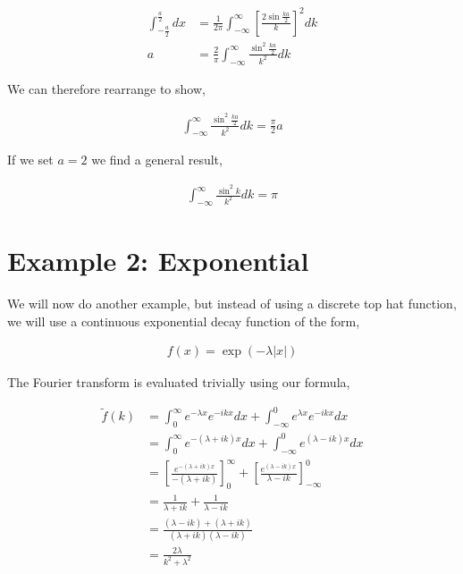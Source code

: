 \documentclass[11pt]{amsart}
\begin{document}
\begin{align*}
  \int_{-\frac{a}{2}}^{\frac{a}{2}}dx &= \frac{1}{2\pi}\int_{-\infty}^{\infty}{\left[\frac{2\sin{\frac{ka}{2}}}{k}\right]}^2 dk \\
  a &= \frac{2}{\pi}\int_{-\infty}^{\infty}\frac{\sin^2{\frac{ka}{2}}}{k^2} dk
\end{align*}

We can therefore rearrange to show,

\begin{align*}
  \int_{-\infty}^{\infty}\frac{\sin^2{\frac{ka}{2}}}{k^2}dk = \frac{\pi}{2}a
\end{align*}

If we set $a = 2$ we find a general result,

\begin{align*}
  \int_{-\infty}^{\infty}\frac{\sin^2{k}}{k^2}dk = \pi
\end{align*}


\section{Example 2: Exponential}

We will now do another example, but instead of using a discrete top hat function, we will use a continuous exponential decay function of the form,

\begin{align*}
  f(x) = \exp{\left(-\lambda |x|\right)}
\end{align*}

The Fourier transform is evaluated trivially using our formula,

\begin{align*}
  \tilde{f}(k) &= \int_{0}^{\infty}e^{-\lambda x}e^{-ikx}dx + \int_{-\infty}^{0}e^{\lambda x}e^{-ikx} dx \\
               &= \int_0^{\infty}e^{-(\lambda + ik)x}dx + \int_{-\infty}^0 e^{(\lambda -ik)x}dx \\
               &= {\left[\frac{e^{-(\lambda + ik)x}}{-(\lambda + ik)}\right]}_0^{\infty} + \left[\frac{e^{(\lambda - ik) x}}{\lambda - ik}\right]_{-\infty}^0 \\
               &= \frac{1}{\lambda + ik} + \frac{1}{\lambda - ik} \\
               &= \frac{(\lambda - ik) + (\lambda + ik)}{(\lambda + ik)(\lambda - ik)} \\
               &= \frac{2\lambda}{k^2 + \lambda^2}
\end{align*}
\end{document}
